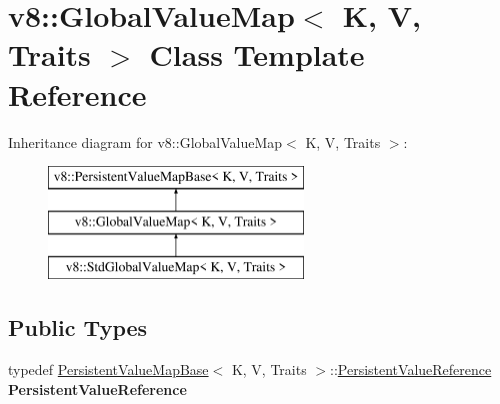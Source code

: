 \hypertarget{classv8_1_1_global_value_map}{}\section{v8\+:\+:Global\+Value\+Map$<$ K, V, Traits $>$ Class Template Reference}
\label{classv8_1_1_global_value_map}
Inheritance diagram for v8\+:\+:Global\+Value\+Map$<$ K, V, Traits $>$\+:\begin{figure}[H]
\begin{center}
\leavevmode
\includegraphics[height=3.000000cm]{classv8_1_1_global_value_map}
\end{center}
\end{figure}
\subsection*{Public Types}
\begin{DoxyCompactItemize}
\item 
typedef \hyperlink{classv8_1_1_persistent_value_map_base}{Persistent\+Value\+Map\+Base}$<$ K, V, Traits $>$\+::\hyperlink{classv8_1_1_persistent_value_map_base_1_1_persistent_value_reference}{Persistent\+Value\+Reference} {\bfseries Persistent\+Value\+Reference}\hypertarget{classv8_1_1_global_value_map_ac01835ce1863e1c577882e31b60efc35}{}\label{classv8_1_1_global_value_map_ac01835ce1863e1c577882e31b60efc35}

\end{DoxyCompactItemize}

